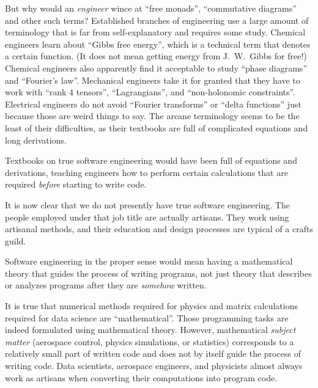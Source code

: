 But why would an \emph{engineer} wince at \textsf{``}free monads\textsf{''}, \textsf{``}commutative
diagrams\textsf{''} and other such terms? Established branches of engineering
use a large amount of terminology that is far from self-explanatory
and requires some study. Chemical engineers learn about \textsf{``}Gibbs free
energy\textsf{''}, which is a technical term that denotes a certain function.
(It does not mean getting energy from J.~W.~Gibbs
for free!) Chemical engineers also apparently find it acceptable to
study \textsf{``}phase diagrams\textsf{''} and \textsf{``}Fourier\textsf{'}s law\textsf{''}. Mechanical engineers
take it for granted that they have to work with \textsf{``}rank 4 tensors\textsf{''},
\textsf{``}Lagrangians\textsf{''}, and \textsf{``}non-holonomic constraints\textsf{''}. Electrical
engineers do not avoid \textsf{``}Fourier transforms\textsf{''} or \textsf{``}delta functions\textsf{''}
just because those are weird things to say. The arcane terminology
seems to be the least of their difficulties, as their textbooks are
full of complicated equations and long derivations.

Textbooks on true software engineering would have been full of equations
and derivations, teaching engineers how to perform certain calculations
that are required \emph{before} starting to write code.


It is now clear that we do not presently have true software engineering.
The people employed under that job title are actually artisans. They
work using artisanal methods, and their education and design processes
are typical of a crafts guild.

Software engineering in the proper sense would mean having a mathematical
theory that guides the process of writing programs, \textemdash{}
not just theory that describes or analyzes programs after they are
\emph{somehow} written.

It is true that numerical methods required for physics and matrix
calculations required for data science are \textsf{``}mathematical\textsf{''}. Those
programming tasks are indeed formulated using mathematical theory.
However, mathematical \emph{subject matter} (aerospace control, physics
simulations, or statistics) corresponds to a relatively small part
of written code and does not by itself guide the process of writing
code. Data scientists, aerospace engineers, and physicists almost
always work as artisans when converting their computations into program
code.

